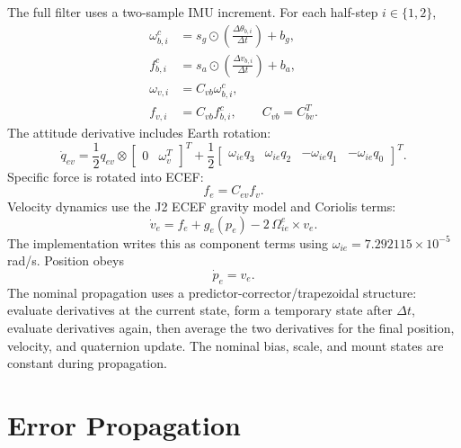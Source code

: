 \documentclass[11pt]{article}
\newcommand{\T}{^{T}}
\newcommand{\dt}{\Delta t}
\begin{document}
The full filter uses a two-sample IMU increment. For each half-step \(i\in
\{1,2\}\),
\begin{align}
  \omega_{b,i}^{c} &= s_g\odot\left(\frac{\Delta\theta_{b,i}}{\dt}\right)+b_g,\\
  f_{b,i}^{c} &= s_a\odot\left(\frac{\Delta v_{b,i}}{\dt}\right)+b_a,\\
  \omega_{v,i} &= C_{vb}\omega_{b,i}^{c},\\
  f_{v,i} &= C_{vb} f_{b,i}^{c},\qquad C_{vb}=C_{bv}\T .
\end{align}
The attitude derivative includes Earth rotation:
\begin{equation}
  \dot q_{ev} =
  \frac{1}{2}q_{ev}\otimes
  \begin{bmatrix}0&\omega_v\T\end{bmatrix}\T
  +\frac{1}{2}
  \begin{bmatrix}
  \omega_{ie} q_3 &
  \omega_{ie} q_2 &
  -\omega_{ie} q_1 &
  -\omega_{ie} q_0
  \end{bmatrix}\T .
\end{equation}
Specific force is rotated into ECEF:
\begin{equation}
  f_e=C_{ev}f_v .
\end{equation}
Velocity dynamics use the J2 ECEF gravity model and Coriolis terms:
\begin{equation}
  \dot v_e =
  f_e + g_e(p_e) - 2\,\Omega_{ie}^{e}\times v_e .
\end{equation}
The implementation writes this as component terms using
\(\omega_{ie}=7.292115\times 10^{-5}\) rad/s. Position obeys
\begin{equation}
  \dot p_e=v_e .
\end{equation}
The nominal propagation uses a predictor-corrector/trapezoidal structure:
evaluate derivatives at the current state, form a temporary state after
\(\dt\), evaluate derivatives again, then average the two derivatives for the
final position, velocity, and quaternion update. The nominal bias, scale, and
mount states are constant during propagation.

\section{Error Propagation}
\end{document}
